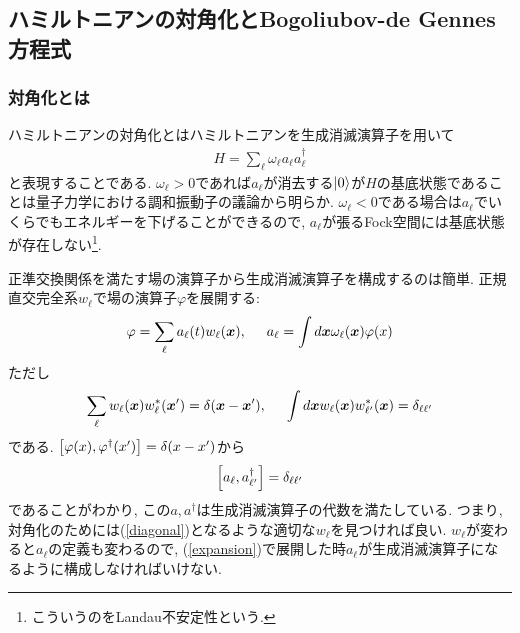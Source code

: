 \documentclass[10.5pt,a4paper]{jreport}
\begin{document}
\subsection{ハミルトニアンの対角化とBogoliubov-de Gennes方程式}
\subsubsection{対角化とは}
ハミルトニアンの対角化とはハミルトニアンを生成消滅演算子を用いて
\begin{eqnarray}
  H = \sum_\ell \omega_{\ell} a_\ell a_\ell^\dagger\label{diagonal}
\end{eqnarray}
と表現することである. $\omega_\ell>0$であれば$a_\ell$が消去する$\ket{0}$が$H$の基底状態であることは量子力学における調和振動子の議論から明らか. $\omega_\ell < 0$である場合は$a_\ell$でいくらでもエネルギーを下げることができるので, $a_\ell$が張るFock空間には基底状態が存在しない\footnote{こういうのをLandau不安定性という. }.

正準交換関係を満たす場の演算子から生成消滅演算子を構成するのは簡単. 正規直交完全系$w_\ell$で場の演算子$\varphi$を展開する:
\begin{eqnarray}
  \varphi = \sum_\ell a_\ell(t)w_\ell(\bm{x}), \hspace{0.5cm} a_\ell = \int d\bm{x} \omega_\ell(\bm{x})\varphi(x)\label{expansion}
\end{eqnarray}
ただし
\begin{eqnarray}
  \sum_\ell w_\ell(\bm{x}) w^*_\ell(\bm{x}') = \delta(\bm{x}-\bm{x}'),\hspace{0.5cm}  \int d\bm{x} w_\ell(\bm{x}) w^*_{\ell'}(\bm{x}) = \delta_{\ell\ell'}
\end{eqnarray}
である. 
$\comm{\varphi(x)}{\varphi^\dagger(x')} = \delta(x - x')$から
\begin{eqnarray}
  \comm{a_\ell}{a^\dagger_{\ell'}} = \delta_{\ell\ell'}
\end{eqnarray}
であることがわかり, この$a, a^\dagger$は生成消滅演算子の代数を満たしている. つまり, 対角化のためには(\ref{diagonal})となるような適切な$w_\ell$を見つければ良い. $w_\ell$が変わると$a_\ell$の定義も変わるので, (\ref{expansion})で展開した時$a_\ell$が生成消滅演算子になるように構成しなければいけない. 
\end{document}
